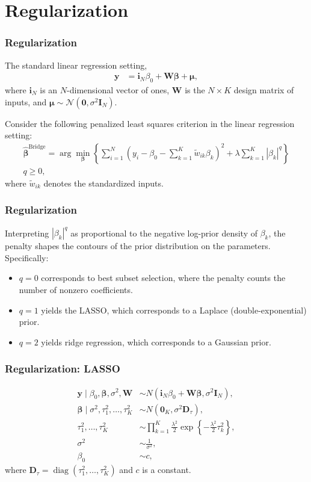 \documentclass[12pt, compress]{beamer}
\begin{document}
\section{Regularization}
\begin{frame}
	\frametitle{Regularization}
The standard linear regression setting,
\begin{align*}
	\mathbf{y} &= \mathbf{i}_N \beta_0 + \mathbf{W}\boldsymbol{\beta} + \boldsymbol{\mu},
\end{align*}
where \(\mathbf{i}_N\) is an \(N\)-dimensional vector of ones, \(\mathbf{W}\) is the \(N \times K\) design matrix of inputs, and \(\boldsymbol{\mu} \sim \mathcal{N}(\mathbf{0}, \sigma^2 \mathbf{I}_N)\).

Consider the following penalized least squares criterion in the linear regression setting:
\begin{align*}
	\hat{\boldsymbol{\beta}}^{\text{Bridge}} = \arg\min_{\boldsymbol{\beta}} \left\{ \sum_{i=1}^N \left( y_i - \beta_0 - \sum_{k=1}^K \tilde{w}_{ik} \beta_k \right)^2 + \lambda \sum_{k=1}^K |\beta_k|^q \right\}\\ q \geq 0,
\end{align*}
where \(\tilde{w}_{ik}\) denotes the standardized inputs.
\end{frame}

\begin{frame}
	\frametitle{Regularization}
Interpreting \( |\beta_k|^q \) as proportional to the negative log-prior density of \( \beta_k \), the penalty shapes the contours of the prior distribution on the parameters. Specifically:
\begin{itemize}
	\item \( q = 0 \) corresponds to best subset selection, where the penalty counts the number of nonzero coefficients.
	\item \( q = 1 \) yields the LASSO, which corresponds to a Laplace (double-exponential) prior.
	\item \( q = 2 \) yields ridge regression, which corresponds to a Gaussian prior.  
	 
\end{itemize}
\end{frame}

\begin{frame}
	\frametitle{Regularization: LASSO}
\begin{align*}
	\mathbf{y} \mid \beta_0, \boldsymbol{\beta}, \sigma^2, \mathbf{W} &\sim {N}(\mathbf{i}_N \beta_0 + \mathbf{W} \boldsymbol{\beta}, \sigma^2 \mathbf{I}_N), \\
	\boldsymbol{\beta} \mid \sigma^2, \tau_1^2, \dots, \tau_K^2 &\sim {N}(\mathbf{0}_K, \sigma^2 \mathbf{D}_{\tau}), \\
	\tau_1^2, \dots, \tau_K^2 &\sim \prod_{k=1}^K \frac{\lambda^2}{2} \exp\left\{ -\frac{\lambda^2}{2} \tau_k^2 \right\}, \\
	\sigma^2 &\sim \frac{1}{\sigma^2},\\
	\beta_0&\sim c,
\end{align*}
where $\mathbf{D}_{\tau} = \operatorname{diag}(\tau_1^2, \dots, \tau_K^2)$ and $c$ is a constant.
\end{frame}
\end{document}

